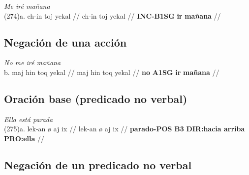 \documentclass{article}%
\begin{document}
%
\par\medskip%
\ex
\textit{Me iré mañana} \\
\begingl
\gla (274)a. ch-in toj yekal //
\glb ch-in toj yekal //
\glc \textbf{INC-}\textbf{B1SG} \textbf{ir} \textbf{mañana} //
\endgl
\xe
%
\medskip%
\subsection{Negación de una acción}%
\label{subsec:Negacindeunaaccin}%

%
\par\medskip%
\ex
\textit{No me iré mañana} \\
\begingl
\gla b. maj hin toq yekal //
\glb maj hin toq yekal //
\glc \textbf{no} \textbf{A1SG} \textbf{ir} \textbf{mañana} //
\endgl
\xe
%
\medskip%
\subsection{Oración base (predicado no verbal)}%
\label{subsec:Oracinbase(predicadonoverbal)}%

%
\par\medskip%
\ex
\textit{Ella está parada} \\
\begingl
\gla (275)a. lek-an ø aj ix //
\glb lek-an ø aj ix //
\glc \textbf{parado-}\textbf{POS} \textbf{B3} \textbf{DIR:hacia arriba} \textbf{PRO:ella} //
\endgl
\xe
%
\medskip%
\subsection{Negación de un predicado no verbal}%
\label{subsec:Negacindeunpredicadonoverbal}%

%
\end{document}
